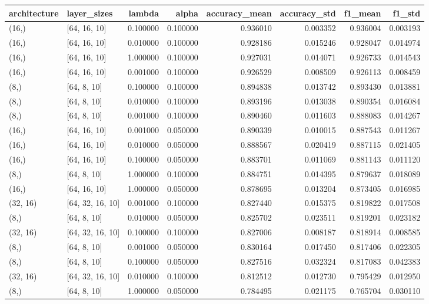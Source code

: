 \begin{tabular}{llrrrrrr}
\toprule
architecture & layer_sizes & lambda & alpha & accuracy_mean & accuracy_std & f1_mean & f1_std \\
\midrule
(16,) & [64, 16, 10] & 0.100000 & 0.100000 & 0.936010 & 0.003352 & 0.936004 & 0.003193 \\
(16,) & [64, 16, 10] & 0.010000 & 0.100000 & 0.928186 & 0.015246 & 0.928047 & 0.014974 \\
(16,) & [64, 16, 10] & 1.000000 & 0.100000 & 0.927031 & 0.014071 & 0.926733 & 0.014543 \\
(16,) & [64, 16, 10] & 0.001000 & 0.100000 & 0.926529 & 0.008509 & 0.926113 & 0.008459 \\
(8,) & [64, 8, 10] & 0.100000 & 0.100000 & 0.894838 & 0.013742 & 0.893430 & 0.013881 \\
(8,) & [64, 8, 10] & 0.010000 & 0.100000 & 0.893196 & 0.013038 & 0.890354 & 0.016084 \\
(8,) & [64, 8, 10] & 0.001000 & 0.100000 & 0.890460 & 0.011603 & 0.888083 & 0.014267 \\
(16,) & [64, 16, 10] & 0.001000 & 0.050000 & 0.890339 & 0.010015 & 0.887543 & 0.011267 \\
(16,) & [64, 16, 10] & 0.010000 & 0.050000 & 0.888567 & 0.020419 & 0.887115 & 0.021405 \\
(16,) & [64, 16, 10] & 0.100000 & 0.050000 & 0.883701 & 0.011069 & 0.881143 & 0.011120 \\
(8,) & [64, 8, 10] & 1.000000 & 0.100000 & 0.884751 & 0.014395 & 0.879637 & 0.018089 \\
(16,) & [64, 16, 10] & 1.000000 & 0.050000 & 0.878695 & 0.013204 & 0.873405 & 0.016985 \\
(32, 16) & [64, 32, 16, 10] & 0.001000 & 0.100000 & 0.827440 & 0.015375 & 0.819822 & 0.017508 \\
(8,) & [64, 8, 10] & 0.010000 & 0.050000 & 0.825702 & 0.023511 & 0.819201 & 0.023182 \\
(32, 16) & [64, 32, 16, 10] & 0.100000 & 0.100000 & 0.827006 & 0.008187 & 0.818914 & 0.008585 \\
(8,) & [64, 8, 10] & 0.001000 & 0.050000 & 0.830164 & 0.017450 & 0.817406 & 0.022305 \\
(8,) & [64, 8, 10] & 0.100000 & 0.050000 & 0.827516 & 0.032324 & 0.817083 & 0.042383 \\
(32, 16) & [64, 32, 16, 10] & 0.010000 & 0.100000 & 0.812512 & 0.012730 & 0.795429 & 0.012950 \\
(8,) & [64, 8, 10] & 1.000000 & 0.050000 & 0.784495 & 0.021175 & 0.765704 & 0.030110 \\

\end{tabular}
